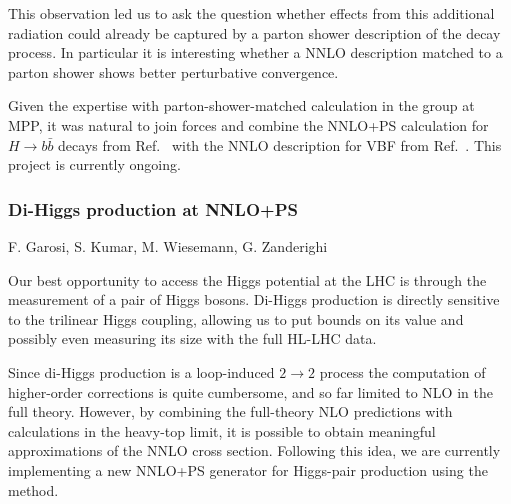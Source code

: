 \documentclass{FBR_Bericht_2025}
\begin{document}
\begin{refsection}
This observation led us to ask the question whether effects from this
additional radiation could already be captured by a parton shower description
of the decay process. In particular it is interesting whether a NNLO
description matched to a parton shower shows better perturbative convergence.

Given the expertise with parton-shower-matched calculation in the group at MPP,
it was natural to join forces and combine the NNLO+PS calculation for $H \to
b\bar{b}$ decays from Ref.~\cite{Bizon:2019tfo} with the NNLO description for
VBF from Ref.~\cite{Asteriadis:2021gpd}. This project is currently ongoing.


\subsubsection{Di-Higgs production at NNLO+PS}
\begin{Namen}
F. Garosi, S. Kumar, M. Wiesemann, G. Zanderighi
\end{Namen}

Our best opportunity to access the Higgs potential at the LHC is through the measurement
of a pair of Higgs bosons. Di-Higgs production is directly sensitive to the trilinear Higgs coupling,
allowing us to put bounds on its value and possibly even measuring its size with the full HL-LHC data.

Since di-Higgs production is a loop-induced $2\to 2$ process the computation of higher-order 
corrections is quite cumbersome, and so far limited to NLO in the full theory. However, by combining
the full-theory NLO predictions with calculations in the heavy-top limit, it is possible to obtain 
meaningful approximations of the NNLO cross section. Following this idea, we are currently 
implementing a new NNLO+PS generator for Higgs-pair production using the \minnlo{} method.


\printbibliography[heading=subbibliography]
\end{refsection}

\end{document}
